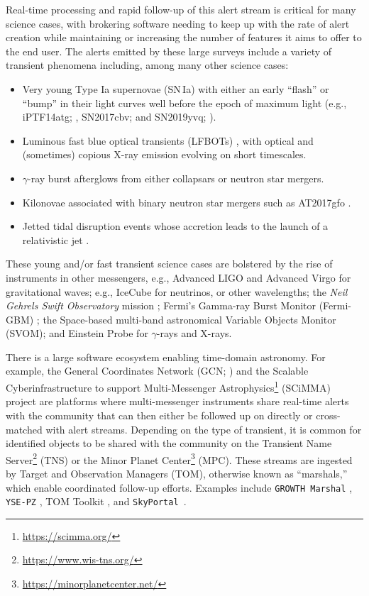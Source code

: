\documentclass[twocolumn]{aastex631}
\newcommand{\skyportal}{\texttt{SkyPortal }}
\begin{document}
Real-time processing and rapid follow-up of this alert stream is critical for many science cases, with brokering software needing to keep up with the rate of alert creation while maintaining or increasing the number of features it aims to offer to the end user. The alerts emitted by these large surveys include a variety of transient phenomena including, among many other science cases:
\begin{itemize}
    \item Very young Type Ia supernovae (SN\,Ia) with either an early ``flash'' or ``bump'' in their light curves well before the epoch of maximum light (e.g., iPTF14atg; \cite{cao_strong_2015}, SN2017cbv; \cite{Hosseinzadeh_2017} and SN2019yvq; \cite{Miller_2020}).
    \item Luminous fast blue optical transients (LFBOTs) \cite{PrMa2018,Perley2019,HoGo2019,HoPe2020,Perley_2021}, with optical and (sometimes) copious X-ray emission evolving on short timescales.
    \item $\gamma$-ray burst afterglows \cite{NyFr2009,GeMe2012} from either collapsars or neutron star mergers.
    \item Kilonovae associated with binary neutron star mergers \citep{AbEA2017b} such as AT2017gfo \citep{CoFo2017,SmCh2017,kasliwal_2017,AbEA2017f}.
    \item Jetted tidal disruption events whose accretion leads to the launch of a relativistic jet \citep{Bloom2011Sci,Andreoni_2022}.
\end{itemize}
These young and/or fast transient science cases are bolstered by the rise of instruments in other messengers, e.g., Advanced LIGO \citep{aLIGO} and Advanced Virgo \citep{adVirgo} for gravitational waves; e.g., IceCube \citep{AaAc2017} for neutrinos, or other wavelengths; the {\it Neil Gehrels Swift Observatory} mission \citep{GeCh2004}; Fermi's Gamma-ray Burst Monitor (Fermi-GBM) \citep{MeLi2009}; the Space-based multi-band astronomical Variable Objects Monitor (SVOM); and Einstein Probe \citep{Yuan_2022} for $\gamma$-rays and X-rays.

There is a large software ecosystem enabling time-domain astronomy.
For example, the General Coordinates Network (GCN; \citealt{SiRa2023}) and the Scalable Cyberinfrastructure to support Multi-Messenger Astrophysics\footnote{\url{https://scimma.org/}} (SCiMMA) project are platforms where multi-messenger instruments share real-time alerts with the community that can then either be followed up on directly or cross-matched with alert streams.
Depending on the type of transient, it is common for identified objects to be shared with the community on the Transient Name Server\footnote{\url{https://www.wis-tns.org/}} (TNS) or the Minor Planet Center\footnote{\url{https://minorplanetcenter.net/}} (MPC).
These streams are ingested by Target and Observation Managers (TOM), otherwise known as ``marshals,'' which enable coordinated follow-up efforts. Examples include \texttt{GROWTH Marshal} \citep{kasliwal_2019}, \texttt{YSE-PZ} \citep{CoJo2023}, TOM Toolkit \citep{StBo2018}, and \skyportal \citep{WaCr2019,Coughlin_2023}.
\end{document}
